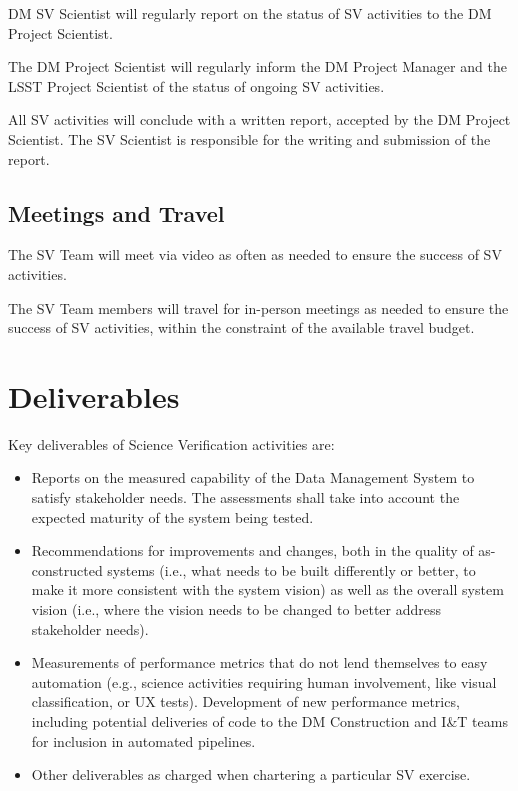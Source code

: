 DM SV Scientist will regularly report on the status of SV activities to the
DM Project Scientist.

The DM Project Scientist will regularly inform the DM Project Manager and
the LSST Project Scientist of the status of ongoing SV activities.

All SV activities will conclude with a written report, accepted by the DM
Project Scientist. The SV Scientist is responsible for the writing and
submission of the report.

\subsection{Meetings and Travel}

The SV Team will meet via video as often as needed to ensure the success of
SV activities.

The SV Team members will travel for in-person meetings as needed to ensure
the success of SV activities, within the constraint of the available travel
budget.

\section{Deliverables}

Key deliverables of Science Verification activities are:
\begin{itemize}

\item Reports on the measured capability of the Data Management System to
satisfy stakeholder needs.  The assessments shall take into account the
expected maturity of the system being tested.

\item Recommendations for improvements and changes, both in the quality of
as-constructed systems (i.e., what needs to be built differently or better,
to make it more consistent with the system vision) as well as the overall
system vision (i.e., where the vision needs to be changed to better address
stakeholder needs).

\item Measurements of performance metrics that do not lend themselves to
easy automation (e.g., science activities requiring human involvement, like
visual classification, or UX tests).  Development of new performance
metrics, including potential deliveries of code to the DM Construction and
I\&T teams for inclusion in automated pipelines.

\item Other deliverables as charged when chartering a particular SV exercise.

\end{itemize}

